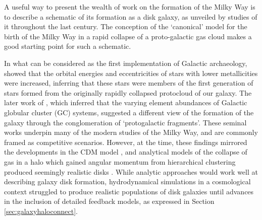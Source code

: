 A useful way to present the wealth of work on the formation of the Milky Way is to describe a schematic of its formation as a disk galaxy, as unveiled by studies of it throughout the last century. The conception of the `canonical' model for the birth of the Milky Way in a rapid collapse of a proto-galactic gas cloud \citep[the ELS model;][]{1962ApJ...136..748E} makes a good starting point for such a schematic. 

In what can be considered as the first implementation of Galactic archaeology, \citet{1962ApJ...136..748E} showed that the orbital energies and eccentricities of stars with lower metallicities were increased, inferring that these stars were members of the first generation of stars formed from the originally rapidly collapsed protocloud of our galaxy. The later work of \citet{1978ApJ...225..357S}, which inferred that the varying element abundances of Galactic globular cluster (GC) systems, suggested a different view of the formation of the galaxy through the conglomeration of `protogalactic fragments'. These seminal works underpin many of the modern studies of the Milky Way, and are commonly framed as competitive scenarios. However, at the time, these findings mirrored the developments in the CDM model \citep{1978MNRAS.183..341W}, and analytical models of the collapse of gas in a halo which gained angular momentum from hierarchical clustering produced seemingly realistic disks \citep{1980MNRAS.193..189F}. While analytic approaches would work well at describing galaxy disk formation, hydrodynamical simulations in a cosmological context struggled to produce realistic populations of disk galaxies until advances in the inclusion of detailed feedback models, as expressed in Section \ref{sec:galaxyhaloconnect}. 



